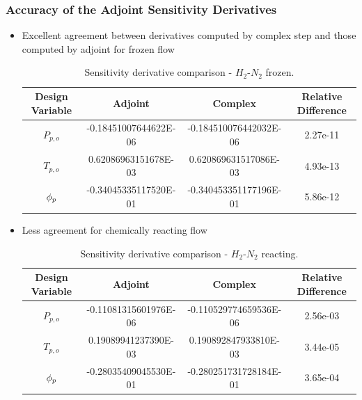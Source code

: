 \documentclass{beamer}
\begin{document}
\begin{frame}
  \frametitle{Accuracy of the Adjoint Sensitivity Derivatives}
  \begin{itemize}
    \item Excellent agreement between derivatives computed by complex step and
      those computed by adjoint for frozen flow
\begin{table}[h] 
  \tiny
  \centering 
  \begin{tabular}{c|c|c|c} 
    Design Variable & Adjoint & Complex & Relative Difference\\
    \hline 
    $P_{p,o}$ & -0.18451007644622E-06 & -0.184510076442032E-06 & 2.27e-11 \\ 
    $T_{p,o}$ &  0.62086963151678E-03 &  0.620869631517086E-03 & 4.93e-13 \\ 
    $\phi_p$     & -0.34045335117520E-01 & -0.340453351177196E-01 & 5.86e-12 
  \end{tabular}
  \caption{Sensitivity derivative comparison - $H_2$-$N_2$ frozen.}
  \label{tab:frozen-deriv-check}
\end{table}
    \item Less agreement for chemically reacting flow
\begin{table}[h]
  \centering
  \tiny
  \begin{tabular}{c|c|c|c}
    Design Variable & Adjoint & Complex & Relative Difference\\
    \hline
    $P_{p,o}$ & -0.11081315601976E-06 & -0.110529774659536E-06 & 2.56e-03 \\
    $T_{p,o}$ &  0.19089941237390E-03 &  0.190892847933810E-03 & 3.44e-05 \\
    $\phi_p$     & -0.28035409045530E-01 & -0.280251731728184E-01 & 3.65e-04
  \end{tabular}
  \caption{Sensitivity derivative comparison - $H_2$-$N_2$ reacting.}
  \label{tab:react-deriv-check}
\end{table}
  \end{itemize}
\end{frame}
\end{document}
